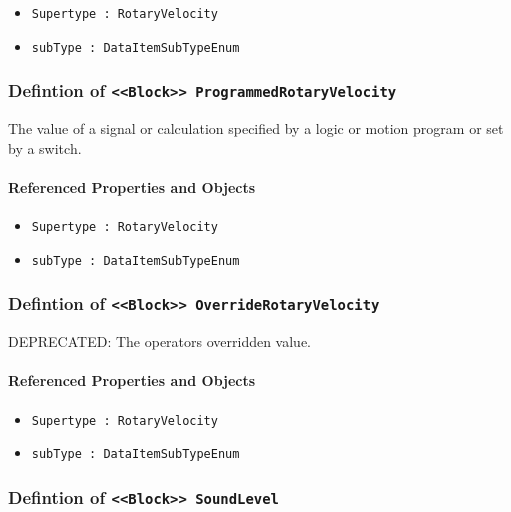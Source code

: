 \begin{itemize}
\item \texttt{Supertype : RotaryVelocity}

\item \texttt{subType : DataItemSubTypeEnum}

\end{itemize}
\FloatBarrier
\subsubsection{Defintion of \texttt{<<Block>> ProgrammedRotaryVelocity}}
  \label{type:ProgrammedRotaryVelocity}

\FloatBarrier

The value of a signal or calculation specified by a logic or motion program or set by a switch.

\FloatBarrier
\paragraph{Referenced Properties and Objects}

\begin{itemize}
\item \texttt{Supertype : RotaryVelocity}

\item \texttt{subType : DataItemSubTypeEnum}

\end{itemize}
\FloatBarrier
\subsubsection{Defintion of \texttt{<<Block>> OverrideRotaryVelocity}}
  \label{type:OverrideRotaryVelocity}

\FloatBarrier

DEPRECATED: The operators overridden value.

\FloatBarrier
\paragraph{Referenced Properties and Objects}

\begin{itemize}
\item \texttt{Supertype : RotaryVelocity}

\item \texttt{subType : DataItemSubTypeEnum}

\end{itemize}
\FloatBarrier
\subsubsection{Defintion of \texttt{<<Block>> SoundLevel}}
  \label{type:SoundLevel}

